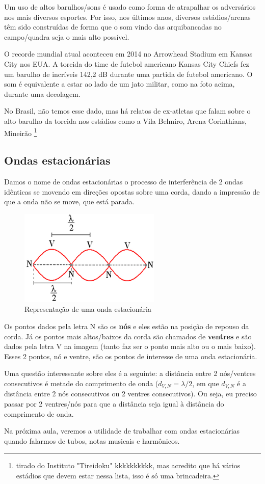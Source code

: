 \documentclass[12pt]{extarticle}
\newcommand{\<}{\langle}
\renewcommand{\>}{\rangle}
\theoremstyle{definition}
\begin{document}
Um uso de altos barulhos/sons é usado como forma de atrapalhar os adversários nos mais diversos esportes. Por isso, nos últimos anos, diversos estádios/arenas têm sido construídas de forma que o som vindo das arquibancadas no campo/quadra seja o mais alto possível. 

O recorde mundial atual aconteceu em 2014 no Arrowhead Stadium em Kansas City nos EUA. A torcida do time de futebol americano Kansas City Chiefs fez um barulho de incríveis 142,2 dB durante uma partida de futebol americano. O som é equivalente a estar ao lado de um jato militar, como na foto acima, durante uma decolagem.

No Brasil, não temos esse dado, mas há relatos de ex-atletas que falam sobre o alto barulho da torcida nos estádios como a Vila Belmiro, Arena Corinthians, Mineirão \footnote{tirado do Instituto "Tireidoku"  kkkkkkkkkk, mas acredito que há vários estádios que devem estar nessa lista, isso é só uma brincadeira.}

\subsection{Ondas estacionárias}
Damos o nome de ondas estacionárias o processo de interferência de 2 ondas idênticas se movendo em direções opostas sobre uma corda, dando a impressão de que a onda não se move, que está parada.
\begin{figure}[H]
    \centering
    \includegraphics[width=0.6\textwidth]{estacionaria.jpg}
    \caption{Representação de uma onda estacionária}
    \label{fig:estacionaria}
\end{figure}
Os pontos dados pela letra N são os \textbf{nós} e eles estão na posição de repouso da corda. Já os pontos mais altos/baixos da corda são chamados de \textbf{ventres} e são dados pela letra V na imagem (tanto faz ser o ponto mais alto ou o mais baixo). Esses 2 pontos, nó e ventre, são os pontos de interesse de uma onda estacionária.

Uma questão interessante sobre eles é a seguinte: a distância entre 2 nós/ventres consecutivos é metade do comprimento de onda ($d_{V,N} = \lambda/2$, em que $d_{V,N}$ é a distância entre 2 nós consecutivos ou 2 ventres consecutivos). Ou seja, eu preciso passar por 2 ventres/nós para que a distância seja igual à distância do comprimento de onda.

Na próxima aula, veremos a utilidade de trabalhar com ondas estacionárias quando falarmos de tubos, notas musicais e harmônicos.
\end{document}
